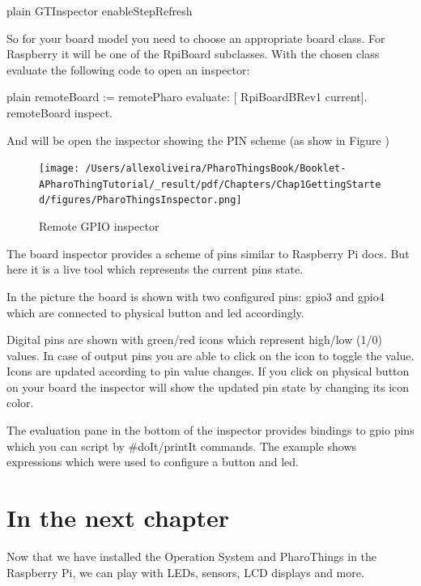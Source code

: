 \documentclass[10pt,twoside,english]{_support/latex/sbabook/sbabook}
\begin{document}
\begin{displaycode}{plain}
GTInspector enableStepRefresh
\end{displaycode}

So for your board model you need to choose an appropriate board class. For Raspberry it will be one of the RpiBoard subclasses. With the chosen class evaluate the following code to open an inspector:

\begin{displaycode}{plain}
remoteBoard := remotePharo evaluate: [ RpiBoardBRev1 current].
remoteBoard inspect.
\end{displaycode}

And will be open the inspector showing the PIN scheme (as show in Figure )


\begin{figure}

\begin{center}
\texttt{[image: /Users/allexoliveira/PharoThingsBook/Booklet-APharoThingTutorial/\_result/pdf/Chapters/Chap1GettingStarted/figures/PharoThingsInspector.png]}\caption{Remote GPIO inspector\label{PharoThingsinspector}}\end{center}
\end{figure}


The board inspector provides a scheme of pins similar to Raspberry Pi docs. But here it is a live tool which represents the current pins state.

In the picture the board is shown with two configured pins: gpio3 and gpio4 which are connected to physical button and led accordingly.

Digital pins are shown with green/red icons which represent high/low (1/0) values. In case of output pins you are able to click on the icon to toggle the value. Icons are updated according to pin value changes. If you click on physical button on your board the inspector will show the updated pin state by changing its icon color.

The evaluation pane in the bottom of the inspector provides bindings to gpio pins which you can script by \#doIt/printIt commands. The example shows expressions which were used to configure a button and led.
\section{In the next chapter}
Now that we have installed the Operation System and PharoThings in the Raspberry Pi, we can play with LEDs, sensors, LCD displays and more. 
\end{document}
